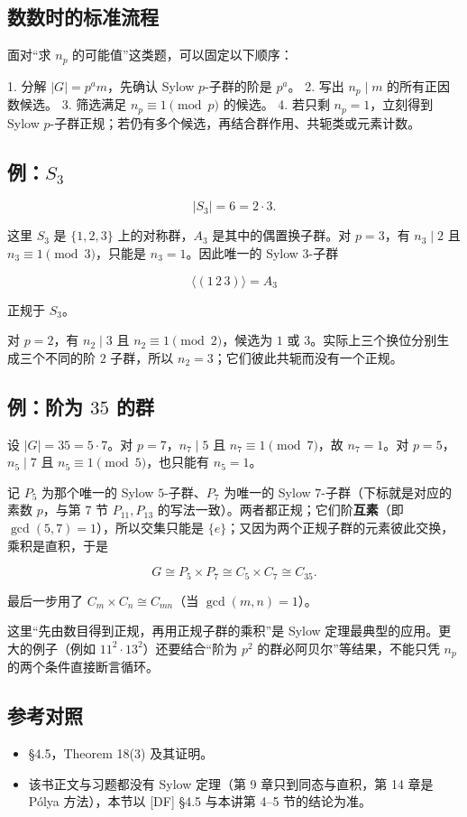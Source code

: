 \subsection{数数时的标准流程}


面对“求 $n_p$ 的可能值”这类题，可以固定以下顺序：

1. 分解 $|G|=p^a m$，先确认 Sylow $p$-子群的阶是 $p^a$。
2. 写出 $n_p\mid m$ 的所有正因数候选。
3. 筛选满足 $n_p\equiv1\pmod p$ 的候选。
4. 若只剩 $n_p=1$，立刻得到 Sylow $p$-子群正规；若仍有多个候选，再结合群作用、共轭类或元素计数。

\subsection{例：$S_3$}


\[
|S_3|=6=2\cdot3.
\]

这里 $S_3$ 是 $\{1,2,3\}$ 上的对称群，$A_3$ 是其中的偶置换子群。对 $p=3$，有 $n_3\mid2$ 且 $n_3\equiv1\pmod3$，只能是 $n_3=1$。因此唯一的 Sylow $3$-子群

\[
\langle(1\,2\,3)\rangle=A_3
\]

正规于 $S_3$。

对 $p=2$，有 $n_2\mid3$ 且 $n_2\equiv1\pmod2$，候选为 $1$ 或 $3$。实际上三个换位分别生成三个不同的阶 $2$ 子群，所以 $n_2=3$；它们彼此共轭而没有一个正规。

\subsection{例：阶为 $35$ 的群}


设 $|G|=35=5\cdot7$。对 $p=7$，$n_7\mid5$ 且 $n_7\equiv1\pmod7$，故 $n_7=1$。对 $p=5$，$n_5\mid7$ 且 $n_5\equiv1\pmod5$，也只能有 $n_5=1$。

记 $P_5$ 为那个唯一的 Sylow $5$-子群、$P_7$ 为唯一的 Sylow $7$-子群（下标就是对应的素数 $p$，与第 7 节 $P_{11},P_{13}$ 的写法一致）。两者都正规；它们阶\textbf{互素}（即 $\gcd(5,7)=1$），所以交集只能是 $\{e\}$；又因为两个正规子群的元素彼此交换，乘积是直积，于是

\[
G\cong P_5\times P_7\cong C_5\times C_7\cong C_{35}.
\]

最后一步用了 $C_m\times C_n\cong C_{mn}$（当 $\gcd(m,n)=1$）。

这里“先由数目得到正规，再用正规子群的乘积”是 Sylow 定理最典型的应用。更大的例子（例如 $11^2\cdot13^2$）还要结合“阶为 $p^2$ 的群必阿贝尔”等结果，不能只凭 $n_p$ 的两个条件直接断言循环。

\subsection{参考对照}


\begin{itemize}
\item [DF] §4.5，Theorem 18(3) 及其证明。
\item [DS] 该书正文与习题都没有 Sylow 定理（第 9 章只到同态与直积，第 14 章是 Pólya 方法），本节以 [DF] §4.5 与本讲第 4--5 节的结论为准。
\end{itemize}

